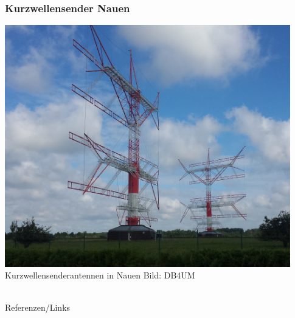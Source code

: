 \begin{frame}
    \frametitle{Kurzwellensender Nauen}
    \begin{center}
        \includegraphics[width=0.93\textwidth]{a09/Nauen_Dipolarray.jpg}\\
        \tiny Kurzwellensenderantennen in Nauen Bild: DB4UM
	\end{center}
\end{frame}



\renewcommand{\refname}{Referenzen}

\hypertarget{refs}{}
\textcolor{white}{} \\ %
\Large Referenzen/Links
\footnotesize

